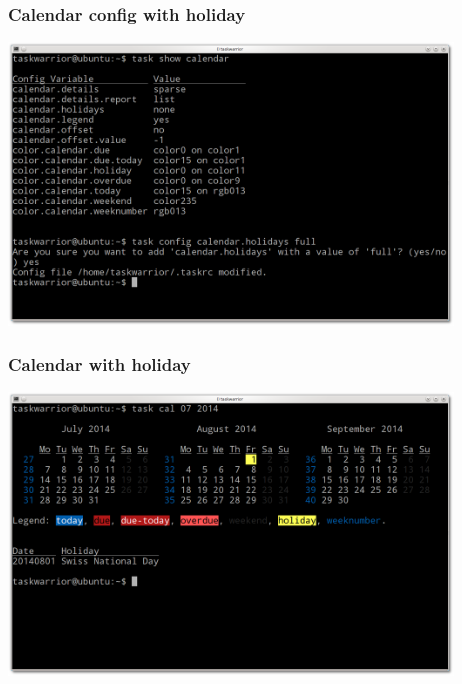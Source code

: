 \documentclass[t,handout]{beamer}
\begin{document}
\begin{frame}[fragile]\frametitle{Calendar config with holiday}
\begin{center} %
\includegraphics[width=11.8cm,height=7.5cm]{calendar-config-with-holiday.png}
\end{center}
\end{frame}

\begin{frame}[fragile]\frametitle{Calendar with holiday}
\begin{center} %
\includegraphics[width=11.8cm,height=7.5cm]{calendar-with-holiday.png}
\end{center}
\end{frame}
\end{document}
